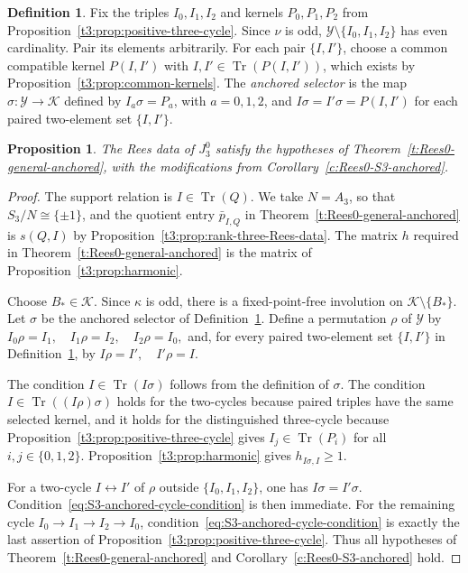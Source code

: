 \documentclass[11pt]{article}
\theoremstyle{plain}
\newtheorem{prop}[theorem]{Proposition}
\theoremstyle{remark}
\theoremstyle{definition}
\newtheorem{definition}[theorem]{Definition}
\theoremstyle{plain}
\DeclareMathOperator{\Tr}{Tr}
\begin{document}
\begin{definition}\label{t3:def:anchored-selector}
Fix the triples $I_0,I_1,I_2$ and kernels $P_0,P_1,P_2$ from
Proposition~\ref{t3:prop:positive-three-cycle}. Since $\nu$ is odd,
$\mathcal Y\setminus\{I_0,I_1,I_2\}$ has even cardinality. Pair its elements
arbitrarily. For each pair $\{I,I'\}$, choose a common compatible kernel
$P(I,I')$ with $I,I'\in\Tr(P(I,I'))$, which exists by
Proposition~\ref{t3:prop:common-kernels}. The \emph{anchored selector} is the map
$\sigma\colon \mathcal Y\to\mathcal K$ defined by
$I_a\sigma=P_a$, with $a=0,1,2$,
and
 $I\sigma=I'\sigma=P(I,I')$
for each paired two-element set $\{I,I'\}$.
\end{definition}

\begin{prop}\label{t3:prop:abstract-hypotheses}
The Rees data of $J_3^0$ satisfy the hypotheses of
Theorem~\ref{t:Rees0-general-anchored}, with the modifications from Corollary~\ref{c:Rees0-S3-anchored}.
\end{prop}

\begin{proof}
The support relation is $I\in\Tr(Q)$. We take $N=A_3$, so that
$S_3/N\cong\{\pm1\}$, and the quotient entry $\bar p_{I,Q}$ in
Theorem~\ref{t:Rees0-general-anchored} is $s(Q,I)$ by
Proposition~\ref{t3:prop:rank-three-Rees-data}. The matrix $h$ required in
Theorem~\ref{t:Rees0-general-anchored} is the matrix of
Proposition~\ref{t3:prop:harmonic}.

Choose $B_\ast\in\mathcal K$. Since $\kappa$ is odd, there is a
fixed-point-free involution on $\mathcal K\setminus\{B_\ast\}$. Let $\sigma$
be the anchored selector of Definition~\ref{t3:def:anchored-selector}. Define a
permutation $\rho$ of $\mathcal Y$ by
\(I_0\rho=I_1, \quad I_1\rho=I_2, \quad I_2\rho=I_0,\)
and, for every paired two-element set $\{I,I'\}$ in
Definition~\ref{t3:def:anchored-selector}, by
\(I\rho=I', \quad I'\rho=I.\)

The condition $I\in\Tr(I\sigma)$ follows from the definition of $\sigma$. The
condition $I\in\Tr((I\rho)\sigma)$ holds for the two-cycles because paired
triples have the same selected kernel, and it holds for the distinguished
three-cycle because Proposition~\ref{t3:prop:positive-three-cycle} gives
$I_j\in\Tr(P_i)$ for all $i,j\in\{0,1,2\}$. Proposition~\ref{t3:prop:harmonic}
gives $h_{I\sigma,I}\ge1$.

For a two-cycle $I\leftrightarrow I'$ of $\rho$ outside
$\{I_0,I_1,I_2\}$, one has $I\sigma=I'\sigma$. Condition~\eqref{eq:S3-anchored-cycle-condition}
is then immediate. For the remaining cycle
$I_0\to I_1\to I_2\to I_0$, condition~\eqref{eq:S3-anchored-cycle-condition}
is exactly the last assertion of Proposition~\ref{t3:prop:positive-three-cycle}.
Thus all hypotheses of Theorem~\ref{t:Rees0-general-anchored} and Corollary~\ref{c:Rees0-S3-anchored} hold.
\end{proof}
\end{document}
